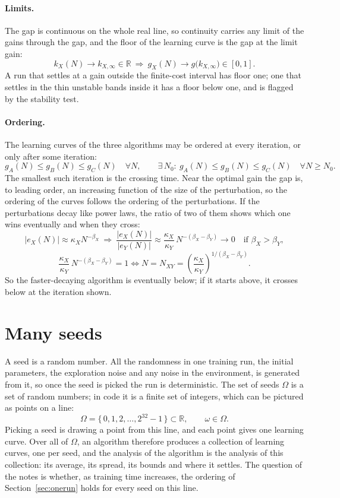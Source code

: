 \documentclass[11pt]{article}
\begin{document}
\paragraph{Limits.} The gap is continuous on the whole real line, so continuity carries any limit of
the gains through the gap, and the floor of the learning curve is the gap at the limit gain:
\[
  k_X(N) \to k_{X,\infty} \in \mathbb{R} \ \Longrightarrow\ g_X(N) \to g\big(k_{X,\infty}\big) \in [0, 1] .
\]
A run that settles at a gain outside the finite-cost interval has floor one; one that settles in the
thin unstable bands inside it has a floor below one, and is flagged by the stability test.

\paragraph{Ordering.} The learning curves of the three algorithms may be ordered at every iteration,
or only after some iteration:
\[
  g_A(N) \le g_B(N) \le g_C(N) \quad \forall N, \qquad
  \exists\, N_0 : \ g_A(N) \le g_B(N) \le g_C(N) \quad \forall N \ge N_0 .
\]
The smallest such iteration is the crossing time. Near the optimal gain the gap is, to leading
order, an increasing function of the size of the perturbation, so the ordering of the curves follows
the ordering of the perturbations. If the perturbations decay like power laws, the ratio of two of
them shows which one wins eventually and when they cross:
\[
  |e_X(N)| \approx \kappa_X N^{-\beta_X}
  \ \Longrightarrow\
  \frac{|e_X(N)|}{|e_Y(N)|} \approx \frac{\kappa_X}{\kappa_Y}\, N^{-(\beta_X - \beta_Y)} \to 0
  \quad \text{if } \beta_X > \beta_Y ,
\]
\[
  \frac{\kappa_X}{\kappa_Y}\, N^{-(\beta_X - \beta_Y)} = 1
  \iff N = N_{XY} = \left(\frac{\kappa_X}{\kappa_Y}\right)^{1/(\beta_X - \beta_Y)} .
\]
So the faster-decaying algorithm is eventually below; if it starts above, it crosses below at the
iteration shown.

\section{Many seeds}
\label{sec:seeds}

A seed is a random number. All the randomness in one training run, the initial parameters, the
exploration noise and any noise in the environment, is generated from it, so once the seed is picked
the run is deterministic. The set of seeds $\Omega$ is a set of random numbers; in code it is a
finite set of integers, which can be pictured as points on a line:
\[
  \Omega = \{\, 0, 1, 2, \dots, 2^{32} - 1 \,\} \subset \mathbb{R}, \qquad \omega \in \Omega .
\]
Picking a seed is drawing a point from this line, and each point gives one learning curve. Over all
of $\Omega$, an algorithm therefore produces a collection of learning curves, one per seed, and the
analysis of the algorithm is the analysis of this collection: its average, its spread, its bounds and
where it settles. The question of the notes is whether, as training time increases, the ordering of
Section~\ref{sec:onerun} holds for every seed on this line.
\end{document}
